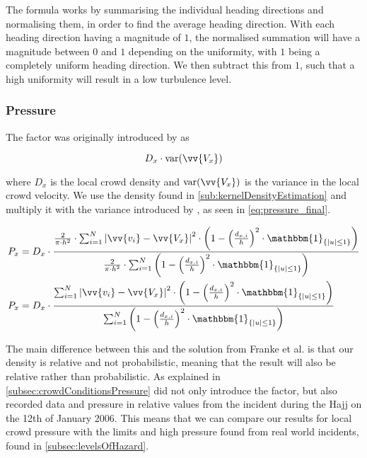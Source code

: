 The formula works by summarising the individual heading directions and normalising them, in order to find the average heading direction. With each heading direction having a magnitude of $1$, the normalised summation will have a magnitude between $0$ and $1$ depending on the uniformity, with $1$ being a completely uniform heading direction. We then subtract this from $1$, such that a high uniformity will result in a low turbulence level.


\subsubsection{Pressure}
The factor was originally introduced by \citet{empircalstudy} as 

\begin{equation}
D_x \cdot \text{var}(\vv{V_x})
\end{equation}

where $D_x$ is the local crowd density and $\text{var}(\vv{V_x})$ is the variance in the local crowd velocity. We use the density found in \cref{sub:kernelDensityEstimation} and multiply it with the variance introduced by \citet{wirz2012inferring}, as seen in \cref{eq:pressure_final}.

\begin{equation}
\label{eq:pressure_final}
\begin{split}
P_x &= D_x \cdot \frac{\frac{2}{\pi \cdot h^2} \cdot \sum_{i=1}^{N} \left|\vv{v_i} - \vv{V_x}\right|^2 \cdot \left(1-\left(\frac{d_{x,i}}{h}\right)^2 \cdot \mathbbm{1}_{\{|u| \leq 1\} }\right)}{\frac{2}{\pi \cdot h^2} \cdot \sum_{i=1}^{N} \left(1-\left(\frac{d_{x,i}}{h}\right)^2 \cdot \mathbbm{1}_{\{|u| \leq 1\} }\right)}\\
%
%
P_x &= D_x \cdot \frac{\sum_{i=1}^{N} \left|\vv{v_i} - \vv{V_x}\right|^2 \cdot \left(1-\left(\frac{d_{x,i}}{h}\right)^2 \cdot \mathbbm{1}_{\{|u| \leq 1\} }\right)}{\sum_{i=1}^{N} \left(1-\left(\frac{d_{x,i}}{h}\right)^2 \cdot \mathbbm{1}_{\{|u| \leq 1\} }\right)}
\end{split}
\end{equation}

The main difference between this and the solution from Franke et al. is that our density is relative and not probabilistic, meaning that the result will also be relative rather than probabilistic. As explained in \cref{subsec:crowdConditionsPressure} \citet{empircalstudy} did not only introduce the factor, but also recorded data and pressure in relative values from the incident during the Hajj on the 12th of January 2006\cite{website:Wikipedia-Hajj}. This means that we can compare our results for local crowd pressure with the limits and high pressure found from real world incidents, found in \cref{subsec:levelsOfHazard}.



